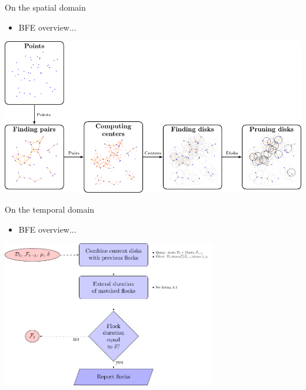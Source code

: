 \documentclass{beamer}
\begin{document}
    \begin{frame}{On the spatial domain}
        \begin{itemize} \item BFE overview... \end{itemize} \vspace{0.5cm}

        \centering
        \includegraphics[width=\textwidth]{../thesis/chapter4/figures/MF_stages2/flow}
    \end{frame}

    \begin{frame}{On the temporal domain}
        \begin{itemize} \item BFE overview... \end{itemize} \vspace{0.5cm}

        \centering
        \includegraphics[width=0.7\textwidth]{../thesis/chapter4/figures/FF_flowchart}
    \end{frame}
\end{document}
